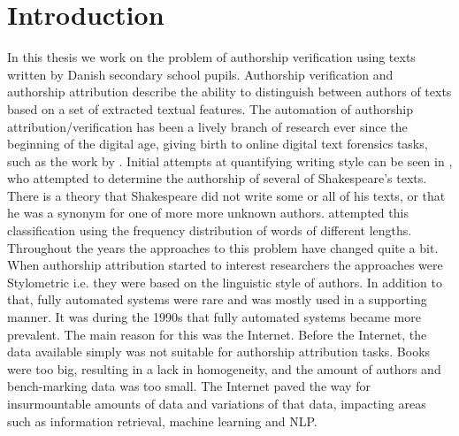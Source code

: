 %

\section{Introduction} \label{sec:introduction}


In this thesis we work on the problem of authorship verification using texts
written by Danish secondary school pupils. Authorship verification and
authorship attribution describe the ability to distinguish between authors of
texts based on a set of extracted textual features. The automation of authorship
attribution/verification has been a lively branch of research ever since the
beginning of the digital age, giving birth to online digital text forensics
tasks, such as the work by \citet{pan:2015}. Initial attempts at quantifying
writing style can be seen in \citet{Mendenhall237}, who attempted to determine
the authorship of several of Shakespeare's texts. There is a theory that
Shakespeare did not write some or all of his texts, or that he was a synonym
for one of more more unknown authors. \citet{Mendenhall237} attempted this
classification using the frequency distribution of words of different lengths.
Throughout the years the approaches to this problem have changed quite a bit.
When authorship attribution started to interest researchers the approaches were
Stylometric i.e. they were based on the linguistic style of authors. In addition
to that, fully automated systems were rare and was mostly used in a supporting
manner. It was during the 1990s that fully automated systems became more
prevalent. The main reason for this was the Internet. Before the Internet, the
data available simply was not suitable for authorship attribution tasks. Books
were too big, resulting in a lack in homogeneity, and the amount of authors and
bench-marking data was too small. The Internet paved the way for insurmountable
amounts of data and variations of that data, impacting areas such as information
retrieval, machine learning and \gls{NLP}.

